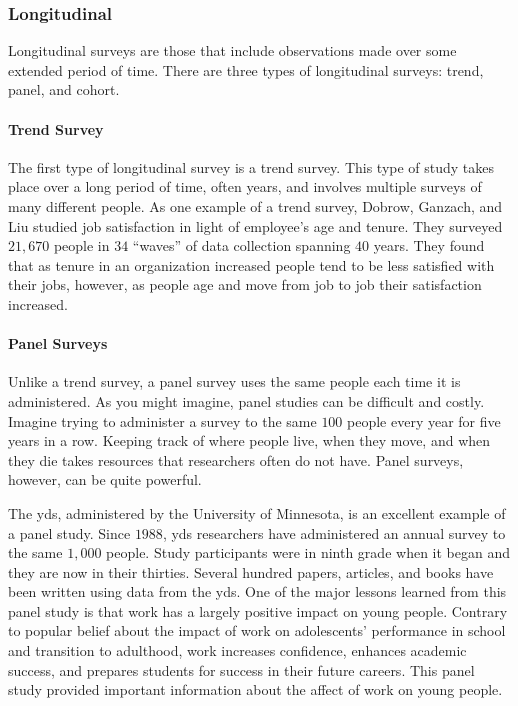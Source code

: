 \subsubsection{Longitudinal}

Longitudinal surveys are those that include observations made over some extended period of time. There are three types of longitudinal surveys: trend, panel, and cohort.

\paragraph{Trend Survey}

The first type of longitudinal survey is a trend survey. This type of study takes place over a long period of time, often years, and involves multiple surveys of many different people. As one example of a trend survey, Dobrow, Ganzach, and Liu\cite{dobrow2015time} studied job satisfaction in light of employee's age and tenure. They surveyed $ 21,670 $ people in $ 34 $ ``waves'' of data collection spanning $ 40 $ years. They found that as tenure in an organization increased people tend to be less satisfied with their jobs, however, as people age and move from job to job their satisfaction increased.

\paragraph{Panel Surveys}

Unlike a trend survey, a panel survey uses the same people each time it is administered. As you might imagine, panel studies can be difficult and costly. Imagine trying to administer a survey to the same $ 100 $ people every year for five years in a row. Keeping track of where people live, when they move, and when they die takes resources that researchers often do not have. Panel surveys, however, can be quite powerful. 

The \gls{yds}\cite{uminn2018youth}, administered by the University of Minnesota, is an excellent example of a panel study. Since $ 1988 $, \gls{yds} researchers have administered an annual survey to the same $ 1,000 $ people. Study participants were in ninth grade when it began and they are now in their thirties. Several hundred papers, articles, and books have been written using data from the \gls{yds}. One of the major lessons learned from this panel study is that work has a largely positive impact on young people. Contrary to popular belief about the impact of work on adolescents' performance in school and transition to adulthood, work increases confidence, enhances academic success, and prepares students for success in their future careers. This panel study provided important information about the affect of work on young people.

